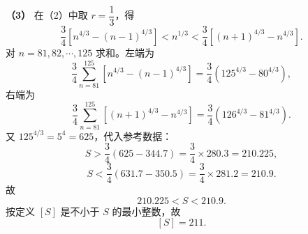 \begin{answer}
\textbf{（3）} 在（2）中取 $r=\dfrac13$，得
\nopagebreak[4]
\[\frac34\left[n^{4/3}-(n-1)^{4/3}\right]<n^{1/3}<\frac34\left[(n+1)^{4/3}-n^{4/3}\right].\]
对 $n=81,82,\cdots,125$ 求和。左端为
\nopagebreak[4]
\[\frac34\sum_{n=81}^{125}\left[n^{4/3}-(n-1)^{4/3}\right]
=\frac34\left(125^{4/3}-80^{4/3}\right),\]
右端为
\nopagebreak[4]
\[\frac34\sum_{n=81}^{125}\left[(n+1)^{4/3}-n^{4/3}\right]
=\frac34\left(126^{4/3}-81^{4/3}\right).\]
又 $125^{4/3}=5^4=625$，代入参考数据：
\nopagebreak[4]
\[S>\frac34(625-344.7)=\frac34\times280.3=210.225,\]
\nopagebreak[4]
\[S<\frac34(631.7-350.5)=\frac34\times281.2=210.9.\]
故
\nopagebreak[4]
\[210.225<S<210.9.\]
按定义 $[S]$ 是不小于 $S$ 的最小整数，故
\nopagebreak[4]
\[[S]=211.\]




\end{answer}